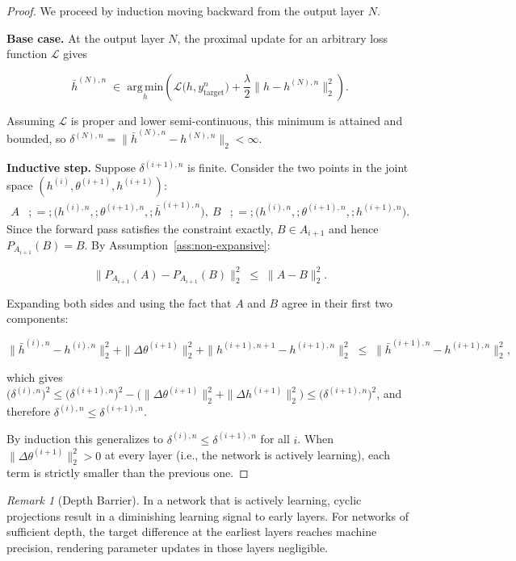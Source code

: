 \documentclass{article}
\theoremstyle{plain}
\theoremstyle{definition}
\theoremstyle{remark}
\newtheorem{remark}[theorem]{Remark}
\begin{document}
\begin{proof}
We proceed by induction moving backward from the output layer $N$.

\medskip\noindent\textbf{Base case.}
At the output layer $N$, the proximal update for an arbitrary loss function $\mathcal{L}$ gives

$$\bar{h}^{(N), n} \;\in\; \underset{h}{\mathrm{arg\,min}} \left( \mathcal{L}\bigl(h, y_{\mathrm{target}}^{n}\bigr) + \frac{\lambda}{2} \bigl\|h - h^{(N), n}\bigr\|_2^2 \right).$$

Assuming $\mathcal{L}$ is proper and lower semi-continuous, this minimum is attained and bounded, so $\delta^{(N), n} = \|\bar{h}^{(N), n} - h^{(N), n}\|_2 < \infty$.

\medskip\noindent\textbf{Inductive step.}
Suppose $\delta^{(i+1), n}$ is finite. Consider the two points in the joint space $(h^{(i)}, \theta^{(i+1)}, h^{(i+1)})$:
\begin{align*}
A &;=; \bigl(h^{(i), n},; \theta^{(i+1), n},; \bar{h}^{(i+1), n}\bigr), \
B &;=; \bigl(h^{(i), n},; \theta^{(i+1), n},; h^{(i+1), n}\bigr).
\end{align*}
Since the forward pass satisfies the constraint exactly, $B \in A_{i+1}$ and hence $P_{A_{i+1}}(B) = B$. By Assumption~\ref{ass:non-expansive}:

$$\|P_{A_{i+1}}(A) - P_{A_{i+1}}(B)\|_2^2 \;\leq\; \|A - B\|_2^2.$$

Expanding both sides and using the fact that $A$ and $B$ agree in their first two components:

$$\|\bar{h}^{(i), n} - h^{(i), n}\|_2^2 + \|\Delta \theta^{(i+1)}\|_2^2 + \| h^{(i+1), n+1} - h^{(i+1), n}\|_2^2
\;\leq\;
\|\bar{h}^{(i+1), n} - h^{(i+1), n}\|_2^2,$$

which gives $\bigl(\delta^{(i), n}\bigr)^2 \leq \bigl(\delta^{(i+1), n}\bigr)^2 - \bigl(\|\Delta \theta^{(i+1)}\|_2^2 + \|\Delta h^{(i+1)}\|_2^2\bigr) \leq \bigl(\delta^{(i+1), n}\bigr)^2$, and therefore $\delta^{(i), n} \leq \delta^{(i+1), n}$.

By induction this generalizes to $\delta^{(i), n} \leq \delta^{(i+1), n}$ for all $i$. When $\|\Delta \theta^{(i+1)}\|_2^2 > 0$ at every layer (i.e., the network is actively learning), each term is strictly smaller than the previous one.
\end{proof}

\begin{remark}[Depth Barrier]
\label{cor:depth-barrier}
In a network that is actively learning, cyclic projections result in a diminishing learning signal to early layers. For networks of sufficient depth, the target difference at the earliest layers reaches machine precision, rendering parameter updates in those layers negligible.
\end{remark}
\end{document}
